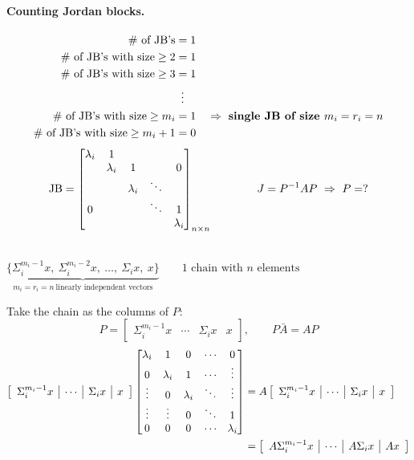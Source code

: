 \paragraph{Counting Jordan blocks.}
\begin{align*}
\#\text{ of JB's}&=1\\
\#\text{ of JB's with size}\geq 2&=1\\
\#\text{ of JB's with size}\geq 3&=1\\
&\ \,\vdots\\
\#\text{ of JB's with size}\geq m_i&=1\quad\Rightarrow\ \text{\key{single JB of size $m_i=r_i=n$}}\\
\#\text{ of JB's with size}\geq m_i+1&=0
\end{align*}
\[
\text{JB}=\begin{bmatrix}\lambda_i&1&&&\\&\lambda_i&1&&0\\&&\lambda_i&\ddots&\\0&&&\ddots&1\\&&&&\lambda_i\end{bmatrix}_{n\times n}
\qquad\qquad J=P^{-1}AP\ \Rightarrow\ P=?
\]
\begin{center}
\\[6pt]
$\displaystyle\underbrace{\{\Sigma_i^{m_i-1}x,\ \Sigma_i^{m_i-2}x,\ \dots,\ \Sigma_i x,\ x\}}_{m_i=r_i=n\ \text{linearly independent vectors}}
\qquad \text{1 chain with $n$ elements}$
\end{center}
\noindent{}Take the chain as the columns of $P$:
\[
P=\left[\begin{array}{c|c|c|c}\Sigma_i^{m_i-1}x&\cdots&\Sigma_i x&x\end{array}\right],\qquad P\bar A=AP
\]
\begin{align*}
\left[\begin{array}{c|c|c|c}\Sigma_i^{m_i-1}x&\cdots&\Sigma_i x&x\end{array}\right]
\begin{bmatrix}\lambda_i&1&0&\cdots&0\\0&\lambda_i&1&\cdots&\vdots\\\vdots&0&\lambda_i&\ddots&\vdots\\\vdots&\vdots&0&\ddots&1\\0&0&0&\cdots&\lambda_i\end{bmatrix}
&=A\left[\begin{array}{c|c|c|c}\Sigma_i^{m_i-1}x&\cdots&\Sigma_i x&x\end{array}\right]\\
&=\left[\begin{array}{c|c|c|c}A\Sigma_i^{m_i-1}x&\cdots&A\Sigma_i x&Ax\end{array}\right]
\end{align*}

